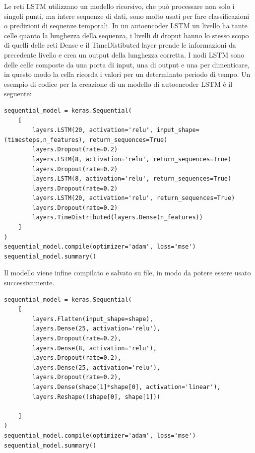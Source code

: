 Le reti LSTM utilizzano un modello ricorsivo, che può processare non solo i singoli punti, ma intere sequenze di dati, sono molto usati per fare classificazioni o predizioni di sequenze temporali.
In un autoencoder LSTM un livello ha tante celle quanto la lunghezza della sequenza, i livelli di droput hanno lo stesso scopo di quelli delle reti Dense e il TimeDistibuted layer prende le informazioni da precedente livello e crea un output della lunghezza corretta.
I nodi LSTM sono delle celle composte da una porta di input, una di output e una per dimenticare, in questo modo la cella ricorda i valori per un determinato periodo di tempo.
Un esempio di codice per la creazione di un modello di autoencoder LSTM è il seguente:
\begin{lstlisting}[language=python3, caption={Modello di un autoencoder LSTM}]
sequential_model = keras.Sequential(
    [
        layers.LSTM(20, activation='relu', input_shape=(timesteps,n_features), return_sequences=True)
        layers.Dropout(rate=0.2)
        layers.LSTM(8, activation='relu', return_sequences=True)
        layers.Dropout(rate=0.2)
        layers.LSTM(8, activation='relu', return_sequences=True)
        layers.Dropout(rate=0.2)
        layers.LSTM(20, activation='relu', return_sequences=True)
        layers.Dropout(rate=0.2)
        layers.TimeDistributed(layers.Dense(n_features))
    ]
)
sequential_model.compile(optimizer='adam', loss='mse')
sequential_model.summary()
\end{lstlisting}

Il modello viene infine compilato e salvato su file, in modo da potere essere usato successivamente.

\begin{lstlisting}[language=python3, label={code:get_data}, caption={Funzione usata per generale il modello della rete neurale}]
sequential_model = keras.Sequential(
    [
        layers.Flatten(input_shape=shape),
        layers.Dense(25, activation='relu'),
        layers.Dropout(rate=0.2),
        layers.Dense(8, activation='relu'),
        layers.Dropout(rate=0.2),
        layers.Dense(25, activation='relu'),
        layers.Dropout(rate=0.2),
        layers.Dense(shape[1]*shape[0], activation='linear'),
        layers.Reshape((shape[0], shape[1]))

    ]
)
sequential_model.compile(optimizer='adam', loss='mse')
sequential_model.summary()
\end{lstlisting}

